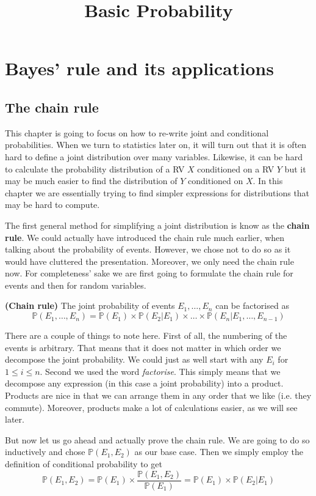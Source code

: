 \documentclass[a4paper,11pt,leqno]{report}
\title{Basic Probability}
\date{}
\begin{document}
\chapter{Bayes' rule and its applications}

\section{The chain rule}

This chapter is going to focus on how to re-write joint and conditional probabilities. When we turn to statistics later on, it will
turn out that it is often hard to define a joint distribution over many variables. Likewise, it can be hard to calculate 
the probability distribution of a RV $ X $ conditioned on a RV $ Y $ but it may be much easier to find the distribution of $ Y $
conditioned on $ X $. In this chapter we are essentially trying to find simpler expressions for distributions that may be hard to
compute.

The first general method for simplifying a joint distribution is know as the \textbf{chain rule}. We could actually have introduced
the chain rule much earlier, when talking about the probability of events. However, we chose not to do so as it would have 
cluttered the presentation. Moreover, we only need the chain rule now. For completeness' sake we are first going to formulate
the chain rule for events and then for random variables.

\begin{Theorem}{\textbf{(Chain rule)}}
The joint probability of events $ E_{1}, \ldots, E_{n} $ can be factorised as
$$ \mathbb{P}(E_{1}, \ldots, E_{n}) = \mathbb{P}(E_{1}) \times \mathbb{P}(E_{2}|E_{1}) \times \ldots \times \mathbb{P}(E_{n}|E_{1}, \ldots, E_{n-1}) $$
\end{Theorem} 

There are a couple of things to note here. First of all, the numbering of the events is arbitrary. That means that it does not matter in which
order we decompose the joint probability. We could just as well start with any $ E_{i} $ for $ 1 \leq i \leq n $. Second we used the 
word \textit{factorise}. This simply means that we decompose any expression (in this case a joint probability) into a product. Products are
nice in that we can arrange them in any order that we like (i.e. they commute). Moreover, products make a lot of calculations easier, as we will
see later.

But now let us go ahead and actually prove the chain rule. We are going to do so inductively and chose $ \mathbb{P}(E_{1}, E_{2}) $ as our
base case. Then we simply employ the definition of conditional probability to get
\begin{equation}
\mathbb{P}(E_{1}, E_{2}) = \mathbb{P}(E_{1}) \times \dfrac{\mathbb{P}(E_{1}, E_{2})}{\mathbb{P}(E_{1})} = \mathbb{P}(E_{1}) \times \mathbb{P}(E_{2}|E_{1})
\end{equation}
\end{document}
